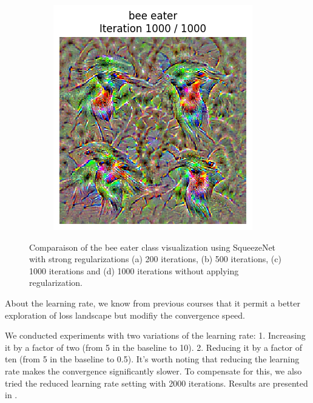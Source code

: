 \begin{figure}[H]
\begin{subfigure}[t]{.25\textwidth}
        \caption{}
        \label{fig:class_viz_iter:sub3}
    \end{subfigure}%
    \begin{subfigure}[t]{.25\textwidth}
        \centering
        \includegraphics[width=\linewidth]{figs_propre2/SqueezeNet/SqueezeNet_bird_animated_1000_last_frame.png}
        \caption{}
        \label{fig:class_viz_iter:sub4}
    \end{subfigure}
    \caption{Comparaison of the bee eater class visualization using SqueezeNet with strong regularizations (a) 200 iterations, (b) 500 iterations, (c) 1000 iterations and (d) 1000 iterations without applying regularization.}
    \label{fig:class_viz_iter}
\end{figure}

About the learning rate, we know from previous courses that it permit a better exploration of loss landscape but modifiy the convergence speed.

We conducted experiments with two variations of the learning rate: 1. Increasing it by a factor of two (from 5 in the baseline to 10). 2. Reducing it by a factor of ten (from 5 in the baseline to 0.5). It's worth noting that reducing the learning rate makes the convergence significantly slower. To compensate for this, we also tried the reduced learning rate setting with 2000 iterations. Results are presented in .

